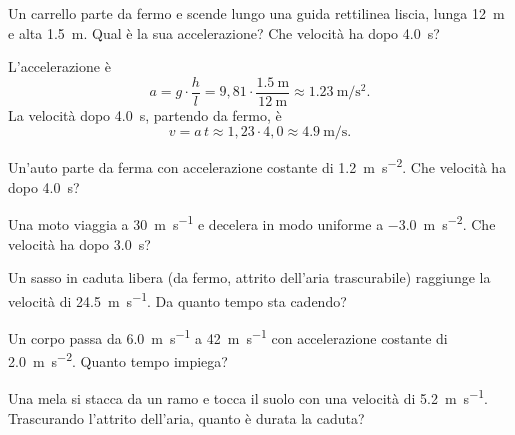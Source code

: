 \begin{testexample}
Un carrello parte da fermo e scende lungo una guida rettilinea liscia, lunga \SI{12}{\metre} e alta \SI{1,5}{\metre}. Qual è la sua accelerazione? Che velocità ha dopo \SI{4,0}{\second}?

L'accelerazione è
\[ a = g \cdot \frac{h}{l} = 9{,}81 \cdot \frac{\SI{1,5}{\metre}}{\SI{12}{\metre}} \approx \SI{1,23}{\metre\per\second\squared}. \]
La velocità dopo \SI{4,0}{\second}, partendo da fermo, è
\[ v = a\,t \approx 1{,}23 \cdot 4{,}0 \approx \SI{4,9}{\metre\per\second}. \]
\end{testexample}

\begin{esercizio}
Un'auto parte da ferma con accelerazione costante di \SI{1,2}{\metre\per\second\squared}. Che velocità ha dopo \SI{4,0}{\second}?\\
\end{esercizio}

\begin{esercizio}
Una moto viaggia a \SI{30}{\metre\per\second} e decelera in modo uniforme a \SI{-3,0}{\metre\per\second\squared}. Che velocità ha dopo \SI{3,0}{\second}?\\
\end{esercizio}

\begin{esercizio}
Un sasso in caduta libera (da fermo, attrito dell'aria trascurabile) raggiunge la velocità di \SI{24,5}{\metre\per\second}. Da quanto tempo sta cadendo?\\
\end{esercizio}

\begin{esercizio}
Un corpo passa da \SI{6,0}{\metre\per\second} a \SI{42}{\metre\per\second} con accelerazione costante di \SI{2,0}{\metre\per\second\squared}. Quanto tempo impiega?\\
\end{esercizio}

\begin{esercizio}
Una mela si stacca da un ramo e tocca il suolo con una velocità di \SI{5,2}{\metre\per\second}. Trascurando l'attrito dell'aria, quanto è durata la caduta?\\
\end{esercizio}


